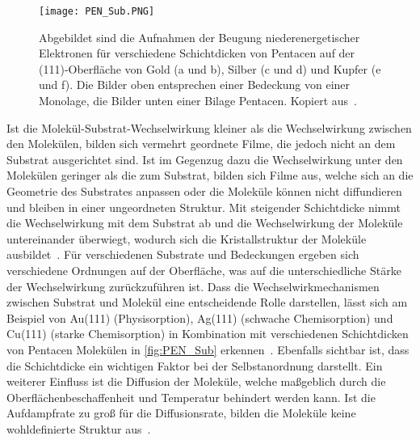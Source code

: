             \begin{figure}
                \centering
                \texttt{[image: PEN\_Sub.PNG]}
                \caption{Abgebildet sind die Aufnahmen der Beugung niederenergetischer Elektronen für verschiedene Schichtdicken von Pentacen auf der (111)-Oberfläche von Gold (a und b), Silber (c und d) und Kupfer (e und f).
                Die Bilder oben entsprechen einer Bedeckung von einer Monolage, die Bilder unten einer Bilage Pentacen.
                Kopiert aus~\cite{5A_4}.}
                \label{fig:PEN_Sub}
            \end{figure}
            Ist die Molekül-Substrat-Wechselwirkung kleiner als die Wechselwirkung zwischen den Molekülen, bilden sich vermehrt geordnete Filme, die jedoch nicht an dem Substrat ausgerichtet sind.
            Ist im Gegenzug dazu die Wechselwirkung unter den Molekülen geringer als die zum Substrat, bilden sich Filme aus, welche sich an die Geometrie des Substrates anpassen oder die Moleküle können nicht diffundieren und bleiben in einer ungeordneten Struktur.
            Mit steigender Schichtdicke nimmt die Wechselwirkung mit dem Substrat ab und die Wechselwirkung der Moleküle untereinander überwiegt, wodurch sich die Kristallstruktur der Moleküle ausbildet~\cite{5A_9}.
            Für verschiedenen Substrate und Bedeckungen ergeben sich verschiedene Ordnungen auf der Oberfläche, was auf die unterschiedliche Stärke der Wechselwirkung zurückzuführen ist.
            Dass die Wechselwirkmechanismen zwischen Substrat und Molekül eine entscheidende Rolle darstellen, lässt sich am Beispiel von Au(111) (Physisorption),  Ag(111) (schwache Chemisorption) und Cu(111) (starke Chemisorption) in Kombination mit verschiedenen Schichtdicken von Pentacen Molekülen in \autoref{fig:PEN_Sub} erkennen~\cite{5A_4}.
            Ebenfalls sichtbar ist, dass die Schichtdicke ein wichtigen Faktor bei der Selbstanordnung darstellt.
            Ein weiterer Einfluss ist die Diffusion der Moleküle, welche maßgeblich durch die Oberflächenbeschaffenheit und Temperatur behindert werden kann.
            Ist die Aufdampfrate zu groß für die Diffusionsrate, bilden die Moleküle keine wohldefinierte Struktur aus~\cite{IF_15}.            

